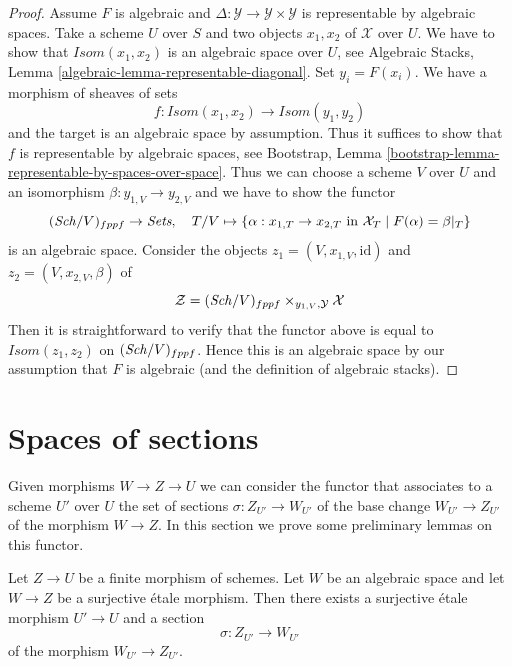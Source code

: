 \begin{proof}
Assume $F$ is algebraic and
$\Delta : \mathcal{Y} \to \mathcal{Y} \times \mathcal{Y}$
is representable by algebraic spaces.
Take a scheme $U$ over $S$ and two objects $x_1, x_2$ of
$\mathcal{X}$ over $U$.
We have to show that $\mathit{Isom}(x_1, x_2)$ is an algebraic space
over $U$, see
Algebraic Stacks, Lemma \ref{algebraic-lemma-representable-diagonal}.
Set $y_i = F(x_i)$. We have a morphism of sheaves of sets
$$
f : \mathit{Isom}(x_1, x_2) \to \mathit{Isom}(y_1, y_2)
$$
and the target is an algebraic space by assumption.
Thus it suffices to show that $f$ is representable by
algebraic spaces, see Bootstrap, Lemma
\ref{bootstrap-lemma-representable-by-spaces-over-space}.
Thus we can choose a scheme $V$ over $U$ and an
isomorphism $\beta : y_{1, V} \to y_{2, V}$ and
we have to show the functor
$$
(\mathit{Sch}/V)_{fppf} \to \textit{Sets},\quad
T/V \mapsto \{\alpha : x_{1, T} \to x_{2, T}
\text{ in }\mathcal{X}_T \mid F(\alpha) = \beta|_T\}
$$
is an algebraic space. Consider the objects
$z_1 = (V, x_{1, V}, \text{id})$ and 
$z_2 = (V, x_{2, V}, \beta)$ of
$$
\mathcal{Z} = (\mathit{Sch}/V)_{fppf} \times_{y_{1, V}, \mathcal{Y}} \mathcal{X}
$$
Then it is straightforward to verify that
the functor above is equal to $\mathit{Isom}(z_1, z_2)$
on $(\mathit{Sch}/V)_{fppf}$. Hence this is an algebraic space
by our assumption that $F$ is algebraic (and the definition
of algebraic stacks).
\end{proof}
















\section{Spaces of sections}
\label{section-spaces-sections}

\noindent
Given morphisms $W \to Z \to U$ we can consider the functor that associates
to a scheme $U'$ over $U$ the set of sections $\sigma : Z_{U'} \to W_{U'}$
of the base change $W_{U'} \to Z_{U'}$ of the morphism $W \to Z$.
In this section we prove some preliminary lemmas on this functor.

\begin{lemma}
\label{lemma-surjection-space-of-sections}
Let $Z \to U$ be a finite morphism of schemes.
Let $W$ be an algebraic space and let $W \to Z$ be a
surjective \'etale morphism. Then there exists a surjective
\'etale morphism $U' \to U$ and a section
$$
\sigma : Z_{U'} \to W_{U'}
$$
of the morphism $W_{U'} \to Z_{U'}$.
\end{lemma}

